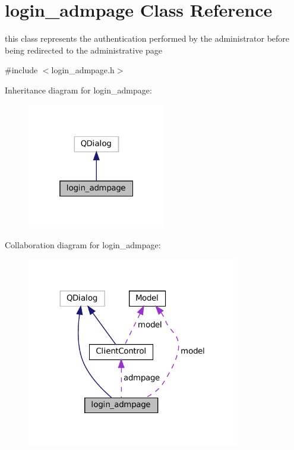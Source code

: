 \hypertarget{classlogin__admpage}{}\section{login\+\_\+admpage Class Reference}
\label{classlogin__admpage}


this class represents the authentication performed by the administrator before being redirected to the administrative page  




{\ttfamily \#include $<$login\+\_\+admpage.\+h$>$}



Inheritance diagram for login\+\_\+admpage\+:
\nopagebreak
\begin{figure}[H]
\begin{center}
\leavevmode
\includegraphics[width=172pt]{classlogin__admpage__inherit__graph}
\end{center}
\end{figure}


Collaboration diagram for login\+\_\+admpage\+:
\nopagebreak
\begin{figure}[H]
\begin{center}
\leavevmode
\includegraphics[width=263pt]{classlogin__admpage__coll__graph}
\end{center}
\end{figure}
